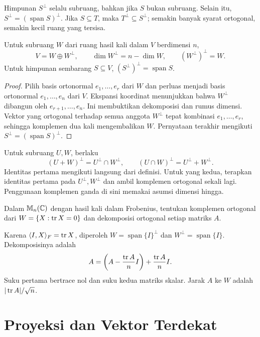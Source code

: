 Himpunan $S^\perp$ selalu subruang, bahkan jika $S$ bukan subruang.
Selain itu, $S^\perp=(\operatorname{span}S)^\perp$.
Jika $S\subseteq T$, maka $T^\perp\subseteq S^\perp$;
semakin banyak syarat ortogonal, semakin kecil ruang yang tersisa.

\begin{teorema}
    Untuk subruang $W$ dari ruang hasil kali dalam $V$ berdimensi $n$,
    \[
        V=W\oplus W^\perp,\qquad
        \dim W^\perp=n-\dim W,\qquad (W^\perp)^\perp=W.
    \]
    Untuk himpunan sembarang $S\subseteq V$,
    $(S^\perp)^\perp=\operatorname{span}S$.
\end{teorema}
\begin{proof}
    Pilih basis ortonormal $e_1,\ldots,e_r$ dari $W$ dan perluas
    menjadi basis ortonormal $e_1,\ldots,e_n$ dari $V$.
    Ekspansi koordinat menunjukkan bahwa $W^\perp$ dibangun
    oleh $e_{r+1},\ldots,e_n$. Ini membuktikan dekomposisi dan
    rumus dimensi. Vektor yang ortogonal terhadap semua anggota
    $W^\perp$ tepat kombinasi $e_1,\ldots,e_r$, sehingga
    komplemen dua kali mengembalikan $W$.
    Pernyataan terakhir mengikuti $S^\perp=(\operatorname{span}S)^\perp$.
\end{proof}

Untuk subruang $U,W$, berlaku
\[
    (U+W)^\perp=U^\perp\cap W^\perp,\qquad
    (U\cap W)^\perp=U^\perp+W^\perp.
\]
Identitas pertama mengikuti langsung dari definisi.
Untuk yang kedua, terapkan identitas pertama pada $U^\perp,W^\perp$
dan ambil komplemen ortogonal sekali lagi.
Penggunaan komplemen ganda di sini memakai asumsi dimensi hingga.

\begin{exam}
    Dalam $\mathbb{M}_n(\mathbb{C})$ dengan hasil kali dalam Frobenius,
    tentukan komplemen ortogonal dari
    $W=\{X:\operatorname{tr} X=0\}$ dan dekomposisi ortogonal setiap matriks $A$.
\end{exam}
\begin{solution}
    Karena $\langle I,X\rangle_F=\operatorname{tr} X$, diperoleh
    $W=\operatorname{span}\{I\}^\perp$ dan $W^\perp=\operatorname{span}\{I\}$.
    Dekomposisinya adalah
    \[
        A=\left(A-\frac{\operatorname{tr} A}{n}I\right)+\frac{\operatorname{tr} A}{n}I.
    \]
    Suku pertama bertrace nol dan suku kedua matriks skalar.
    Jarak $A$ ke $W$ adalah $|\operatorname{tr} A|/\sqrt n$.
\end{solution}

\section{Proyeksi dan Vektor Terdekat}

